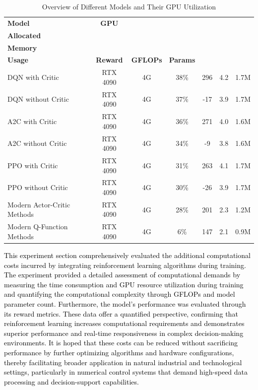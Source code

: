 \documentclass[preprint,12pt]{elsarticle}
\begin{document}
\begin{table}[ht!]
\centering
\caption{Overview of Different Models and Their GPU Utilization}
\label{tab:gpu_models}
\begin{tabularx}{\textwidth}{@{}lcccccc@{}}
\toprule
\textbf{\footnotesize Model} & \textbf{\footnotesize GPU} & \makecell{\textbf{\scriptsize GPU }\\ \textbf{\scriptsize Allocated} \\ \textbf{\scriptsize Memory}} & \makecell{\textbf{\scriptsize GPU }\\ \textbf{\scriptsize Usage} } & \textbf{\footnotesize Reward} & \textbf{\footnotesize GFLOPs} & \textbf{\footnotesize Params} \\
\midrule
DQN with Critic & RTX 4090 & 4G & 38\% & 296 & 4.2 & 1.7M \\
DQN without Critic & RTX 4090 & 4G & 37\% & -17 & 3.9 & 1.7M \\
A2C with Critic & RTX 4090 & 4G & 36\% & 271 & 4.0 & 1.6M \\
A2C without Critic & RTX 4090 & 4G & 34\% & -9 & 3.8 & 1.6M \\
PPO with Critic & RTX 4090 & 4G & 31\% & 263 & 4.1 & 1.7M \\
PPO without Critic & RTX 4090 & 4G & 30\% & -26 & 3.9 & 1.7M \\
Modern Actor-Critic Methods & RTX 4090 & 4G & 28\% & 201 & 2.3 & 1.2M \\
Modern Q-Function Methods & RTX 4090 & 4G & 6\% & 147 & 2.1 & 0.9M \\
\bottomrule
\end{tabularx}
\end{table}

\textcolor{black}{This experiment section comprehensively evaluated the additional computational costs incurred by integrating reinforcement learning algorithms during training. The experiment provided a detailed assessment of computational demands by measuring the time consumption and GPU resource utilization during training and quantifying the computational complexity through GFLOPs and model parameter count. Furthermore, the model's performance was evaluated through its reward metrics. These data offer a quantified perspective, confirming that reinforcement learning increases computational requirements and demonstrates superior performance and real-time responsiveness in complex decision-making environments. It is hoped that these costs can be reduced without sacrificing performance by further optimizing algorithms and hardware configurations, thereby facilitating broader application in natural industrial and technological settings, particularly in numerical control systems that demand high-speed data processing and decision-support capabilities.}
\end{document}
